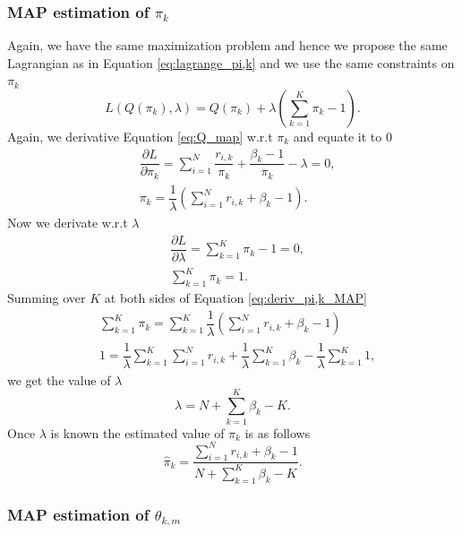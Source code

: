 \documentclass[12pt]{article}
\begin{document}
\subsubsection{MAP estimation of $\pi_{k}$}

\noindent Again, we have the same maximization problem and hence we propose the same Lagrangian as in Equation \ref{eq:lagrange_pi,k} and we use the same constraints on $\pi_k$
\begin{equation}
L\left( Q(\pi_{k}),\lambda \right) = Q(\pi_{k}) + \lambda \left( \sum \limits_{k=1}^{K} \pi_{k} - 1 \right).
\end{equation}
Again, we derivative Equation \ref{eq:Q_map} w.r.t $\pi_{k}$ and equate it to 0
\begin{align}
& \dfrac{\partial L}{\partial \pi_{k}} =  \sum \limits_{i=1}^{N} \dfrac{r_{i,k}}{\pi_{k}} + \dfrac{\beta_{k}-1}{\pi_k} - \lambda = 0 ,\\
& \pi_{k} = \dfrac{1}{\lambda} \left( \sum \limits_{i=1}^{N} r_{i,k} + \beta_{k} - 1\right)\label{eq:deriv_pi,k_MAP}.
\end{align}
Now we derivate w.r.t $\lambda$
\begin{align}
& \dfrac{\partial L}{\partial \lambda} = \sum \limits_{k=1}^{K} \pi_{k} - 1 = 0 , \\
& \sum \limits_{k=1}^{K} \pi_{k} = 1.
\end{align}
Summing over $K$ at both sides of Equation \ref{eq:deriv_pi,k_MAP}
\begin{align}
& \sum \limits_{k=1}^{K}\pi_{k} = \sum \limits_{k=1}^{K} \dfrac{1}{\lambda} \left( \sum \limits_{i=1}^{N} r_{i,k} + \beta_{k} - 1\right)\\
& 1 = \dfrac{1}{\lambda} \sum \limits_{k=1}^{K} \sum \limits_{i=1}^{N} r_{i,k} + \dfrac{1}{\lambda} \sum \limits_{k=1}^{K} \beta_{k} - \dfrac{1}{\lambda} \sum \limits_{k=1}^{K} 1,
\end{align}
we get the value of $\lambda$
\begin{equation}
\lambda = N + \sum \limits_{k=1}^{K} \beta_{k} - K.
\end{equation}
Once $\lambda$ is known the estimated value of $\pi_{k}$ is as follows
\begin{equation}
\hat{\pi}_{k} = \dfrac{\sum \limits_{i=1}^{N} r_{i,k} + \beta_{k} - 1}{N + \sum \limits_{k=1}^{K} \beta_{k} - K}.
\end{equation}

\subsubsection{MAP estimation of $\theta_{k,m}$}
\end{document}
